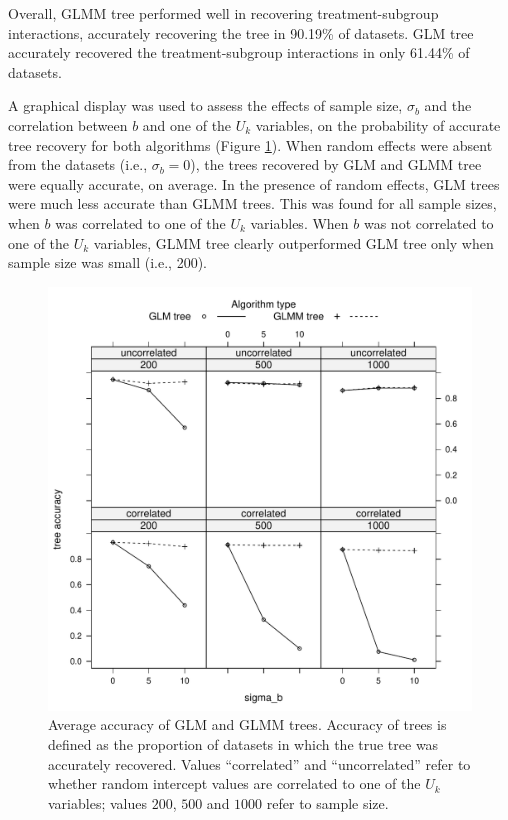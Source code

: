 \documentclass[nobf,doc]{apa}
\begin{document}
Overall, GLMM tree performed well in recovering treatment-subgroup interactions, accurately recovering the tree in 90.19\% of datasets. GLM tree accurately recovered the treatment-subgroup interactions in only 61.44\% of datasets. 

A graphical display was used to assess the effects of sample size, $\sigma_b$ and the correlation between $b$ and one of the $U_k$ variables, on the probability of accurate tree recovery for both algorithms (Figure \ref{fig:xyplot_treeaccuracy}). When random effects were absent from the datasets (i.e., $\sigma_b = 0$), the trees recovered by GLM and GLMM tree were equally accurate, on average. In the presence of random effects, GLM trees were much less accurate than GLMM trees. This was found for all sample sizes, when $b$ was correlated to one of the $U_k$ variables. When $b$ was not correlated to one of the $U_k$ variables, GLMM tree clearly outperformed GLM tree only when sample size was small (i.e., 200).



\begin{figure}[!htbp]
	\includegraphics[width=12cm]{xy_accuracy.pdf}
	\caption{Average accuracy of GLM and GLMM trees. Accuracy of trees is defined as the proportion of datasets in which the true tree was accurately recovered. Values ``correlated'' and ``uncorrelated'' refer to whether random intercept values are correlated to one of the $U_k$ variables; values $200$, $500$ and $1000$ refer to sample size.}
	\label{fig:xyplot_treeaccuracy}
\end{figure}
\end{document}
